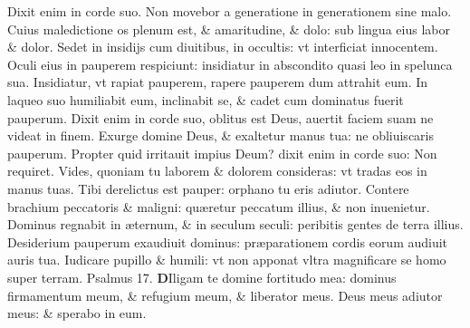 \documentclass[a5paper,10pt]{book}
\def\ae{æ}
\begin{document}
\begin{multicols*}{2}
\newline \color{red} D\color{black}ixit enim in corde suo. Non movebor a generatione in generationem sine malo.
\newline \color{red} C\color{black}uius maledictione os plenum est, \& amaritudine, \& dolo: sub lingua eius labor \& dolor.
\newline \color{red} S\color{black}edet in insidijs cum diuitibus, in occultis: vt interficiat innocentem.
\newline \color{red} O\color{black}culi eius in pauperem respiciunt: insidiatur in abscondito quasi leo in spelunca sua.
\newline \color{red} I\color{black}nsidiatur, vt rapiat pauperem, rapere pauperem dum attrahit eum.
\newline \color{red} I\color{black}n laqueo suo humiliabit eum, inclinabit se, \& cadet cum dominatus fuerit pauperum.
\newline \color{red} D\color{black}ixit enim in corde suo, oblitus est Deus, auertit faciem suam ne videat in finem.
\newline \color{red} E\color{black}xurge domine Deus, \& exaltetur manus tua: ne obliuiscaris pauperum.
\newline \color{red} P\color{black}ropter quid irritauit impius Deum? dixit enim in corde suo: Non requiret.
\newline \color{red} V\color{black}ides, quoniam tu laborem \& dolorem consideras: vt tradas eos in manus tuas.
\newline \color{red} T\color{black}ibi derelictus est pauper: orphano tu eris adiutor.
\newline \color{red} C\color{black}ontere brachium peccatoris \& maligni: qu\ae retur peccatum illius, \& non inuenietur.
\newline \color{red} D\color{black}ominus regnabit in \ae ternum, \& in seculum seculi: peribitis gentes de terra illius.
\newline \color{red} D\color{black}esiderium pauperum exaudiuit dominus: pr\ae parationem cordis eorum audiuit auris tua.
\newline \color{red} I\color{black}udicare pupillo \& humili: vt non apponat vltra magnificare se homo super terram. \quad \color{red} Psalmus 17. \color{black}
\vspace{-1em}
\lettrine[lines=2]{\bfseries \color{red} D}{}Iligam te domine fortitudo mea: dominus firmamentum meum, \& refugium meum, \& liberator meus.
\newline \color{red} D\color{black}eus meus adiutor meus: \& sperabo in eum.

\end{multicols*}
\end{document}
